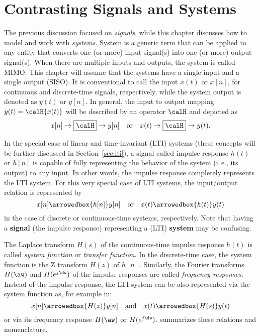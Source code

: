 \section{Contrasting Signals and Systems}

The previous discussion focused on \emph{signals}, while this chapter discusses how to model and work with \emph{systems}. System is a generic term that can be applied to any entity that converts one (or more) input signal(s) into one (or more) output signal(s). When there are multiple inputs and outputs, the system is called MIMO. This chapter will assume that the systems have a single input and a single output (SISO). It is conventional to call the input $x(t)$ or $x[n]$, for continuous and discrete-time signals, respectively, while the system output is denoted as $y(t)$ or $y[n]$. In general, the input to output mapping $y(t)=\calH\{x(t)\}$ will be described by an operator $\calH$ and depicted as 
\[
x[n] \rightarrow\boxed{\calH}\rightarrow y[n] \quad\textrm{or}\quad  x(t) \rightarrow\boxed{\calH}\rightarrow y(t).
\]

In the special case of linear and time-invariant (LTI) systems (these concepts will be further discussed in Section~\ref{sec:lti}), a signal called impulse response $h(t)$ or $h[n]$ is capable of fully representing the behavior of the system (i.\,e., its output) to any input. In other words, the impulse response completely represents the LTI system. For this very special case of LTI systems, the input/output relation is represented by
\[
x[n] \arrowedbox{h[n]} y[n] \quad\textrm{or}\quad  x(t) \arrowedbox{h(t)} y(t)
\]
in the case of discrete or continuous-time systems, respectively.
Note that having a \textbf{signal} (the impulse response) representing a (LTI) \textbf{system} may be confusing. 

The Laplace transform $H(s)$ of the continuous-time impulse response $h(t)$ is called \emph{system function} or \emph{transfer function}. In the discrete-time case, the system function is the Z transform $H(z)$ of $h[n]$. Similarly, the Fourier transforms $H(\aw)$ and $H(e^{j \dw})$ of the impulse responses are called \emph{frequency responses}. Instead of the impulse response, the LTI system can be also represented via the system function as, for example in:
\[
x[n] \arrowedbox{H(z)} y[n] \quad\textrm{and}\quad  x(t) \arrowedbox{H(s)} y(t)
\]
or via its frequency response $H(\aw)$ or $H(e^{j \dw})$.  summarizes these relations and nomenclature.

